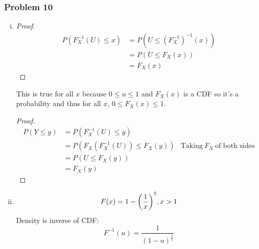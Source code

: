 \documentclass[11pt]{extarticle}
\DeclarePairedDelimiter\autobracket{(}{)}
\newcommand{\br}[1]{\autobracket*{#1}}
\begin{document}
\subsubsection*{Problem 10}





\begin{enumerate}[(i)]

\item 




\begin{proof}
\begin{align*}
P(F_X^{-1}(U) \leq x) & = P(U \leq (F_X^{-1})^{-1}(x) ) \\
& = P(U \leq F_X(x)) \\ 
& = F_X(x)
\end{align*}
\end{proof}

This is true for all $x$ because $0 \leq u \leq 1$  and $F_X(x)$ is a CDF so it's a probability and thus for all $x$, $0 \leq F_X(x) \leq 1$.


\begin{proof}
\begin{align*}P(Y \leq y) &= P(F_X^{-1}(U) \leq y) \\
&= P(F_X(F_X^{-1}(U)) \leq F_X(y))	& \text{Taking}\ F_X\ \text{of both sides}\\
&= P(U \leq F_X(y))	\\
&= F_X(y)
\end{align*}
\end{proof}


\item 


$$F(x) = 1 - \br{ \frac{1}{x} }^5, x > 1$$
Density is inverse of CDF: $$F^{-1}(u) = \frac{1}{(1-u)^{\frac{1}{5}}}$$


\end{enumerate}
\end{document}
